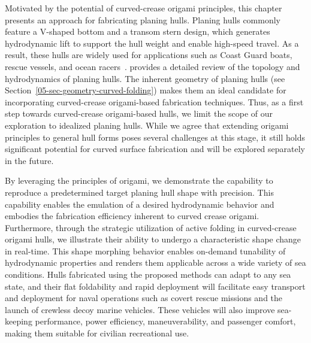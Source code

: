 Motivated by the potential of curved-crease origami principles, this chapter presents an approach for fabricating planing hulls. Planing hulls commonly feature a V-shaped bottom and a transom stern design, which generates hydrodynamic lift to support the hull weight and enable high-speed travel. As a result, these hulls are widely used for applications such as Coast Guard boats, rescue vessels, and ocean racers~\cite{savitsky_planing_1985}. \cite{tavakoli_review_2024} provides a detailed review of the topology and hydrodynamics of planing hulls. The inherent geometry of planing hulls (see Section~\ref{05-sec-geometry-curved-folding}) makes them an ideal candidate for incorporating curved-crease origami-based fabrication techniques. Thus, as a first step towards curved-crease origami-based hulls, we limit the scope of our exploration to idealized planing hulls. While we agree that extending origami principles to general hull forms poses several challenges at this stage, it still holds significant potential for curved surface fabrication and will be explored separately in the future.

By leveraging the principles of origami, we demonstrate the capability to reproduce a predetermined target planing hull shape with precision. This capability enables the emulation of a desired hydrodynamic behavior and embodies the fabrication efficiency inherent to curved crease origami. Furthermore, through the strategic utilization of active folding in curved-crease origami hulls, we illustrate their ability to undergo a characteristic shape change in real-time. This shape morphing behavior enables on-demand tunability of hydrodynamic properties and renders them applicable across a wide variety of sea conditions. Hulls fabricated using the proposed methods can adapt to any sea state, and their flat foldability and rapid deployment will facilitate easy transport and deployment for naval operations such as covert rescue missions and the launch of crewless decoy marine vehicles. These vehicles will also improve sea-keeping performance, power efficiency, maneuverability, and passenger comfort, making them suitable for civilian recreational use.

